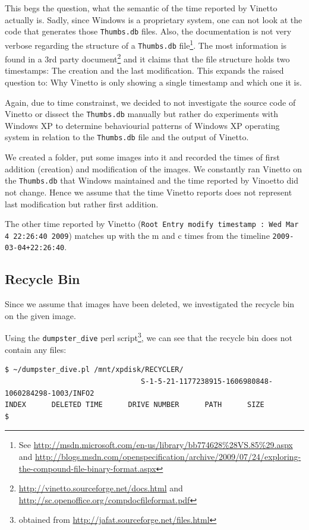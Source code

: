 \documentclass[a4paper,
    11pt,
    normalheadings,
    parindent,
    UKenglish,
    abstracton,
    ]{scrartcl}
\begin{document}
This begs the question, what the semantic of the time reported by Vinetto actually is.
Sadly, since Windows is a proprietary system, one can not look at the code that generates those \texttt{Thumbs.db} files.
Also, the documentation is not very verbose regarding the structure of a \texttt{Thumbs.db} file\footnote{See \url{http://msdn.microsoft.com/en-us/library/bb774628\%28VS.85\%29.aspx} and \url{http://blogs.msdn.com/openspecification/archive/2009/07/24/exploring-the-compound-file-binary-format.aspx}}.
The most information is found in a 3rd party document\footnote{\url{http://vinetto.sourceforge.net/docs.html} and \url{http://sc.openoffice.org/compdocfileformat.pdf}} and it claims that the file structure holds two timestamps: The creation and the last modification.
This expands the raised question to: Why Vinetto is only showing a single timestamp and which one it is.

Again, due to time constrainst, we decided to not investigate the source code of Vinetto or dissect the \texttt{Thumbs.db} manually
 but rather do experiments with Windows XP to determine behaviourial patterns of Windows XP operating system in relation to the \texttt{Thumbs.db} file and the output of Vinetto.


We created a folder, put some images into it and recorded the times of first addition (creation) and modification of the images.
We constantly ran Vinetto on the \texttt{Thumbs.db} that Windows maintained and the time reported by Vinoetto did not change.
Hence we assume that the time Vinetto reports does not represent last modification but rather first addition.

The other time reported by Vinetto ({\tt Root Entry modify timestamp : Wed Mar  4 22:26:40 2009}) matches up with the m and c times from the timeline {\tt 2009-03-04+22:26:40}.








\subsection{Recycle Bin}

Since we assume that images have been deleted, we investigated the recycle bin on the given image.

Using the {\tt dumpster\_dive} perl script\footnote{obtained from \url{http://jafat.sourceforge.net/files.html}}, we can see that the recycle bin does not contain any files:
\begin{verbatim}
$ ~/dumpster_dive.pl /mnt/xpdisk/RECYCLER/
                                S-1-5-21-1177238915-1606980848-1060284298-1003/INFO2
INDEX      DELETED TIME      DRIVE NUMBER      PATH      SIZE
$
\end{verbatim}
\end{document}

